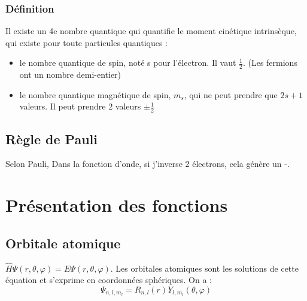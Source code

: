 \documentclass[french]{yLectureNote}
\begin{document}
\subsubsection{Définition}
	Il existe un 4e nombre quantique qui quantifie le moment cinétique intrinsèque, qui existe pour toute particules quantiques :
	\begin{itemize}
	 \item le nombre quantique de spin, noté s pour l'électron. Il vaut $\frac{1}{2}$. (Les fermions ont un nombre demi-entier)
	 \item le nombre quantique magnétique de spin, $m_s$, qui ne peut prendre que $2s+1$ valeurs. Il peut prendre 2 valeurs $\pm\frac{1}{2}$
	\end{itemize}
	\subsection{Règle de Pauli}
Selon Pauli, Dans la fonction d'onde, si j'inverse 2 électrons, cela génère un -.

\section{Présentation des fonctions}
\subsection{Orbitale atomique}
$\hat{H}\Psi(r,\theta,\varphi) = E\Psi(r,\theta,\varphi)$. Les orbitales atomiques sont les solutions de cette équation et s'exprime en coordonnées sphériques.
On a : \[\Psi_{n,l,m_l} = R_{n,l}(r)Y_{l,m_l}(\theta,\varphi)\]
\end{document}
